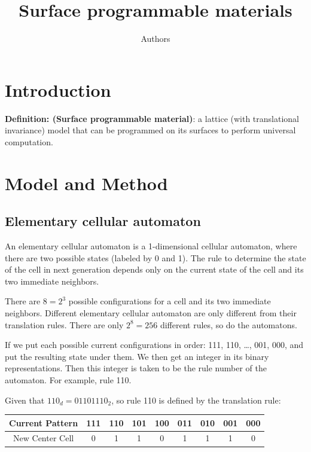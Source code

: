 \documentclass[twocolumn,superscriptaddress,english,showpacs,longbibliography]{revtex4-2}
\begin{document}
\title{Surface programmable materials}

\author{Authors}

\begin{abstract}
\end{abstract}

\maketitle

\section{Introduction}

\textbf{Definition: (Surface programmable material)}: a lattice (with
translational invariance) model that can be programmed on its surfaces
to perform universal computation.

\section{Model and Method}
\subsection{Elementary cellular automaton}\label{elementary-cellular-automaton}

An elementary cellular automaton is a 1-dimensional cellular
automaton, where there are two possible states (labeled by 0 and 1). The rule to
determine the state of the cell in next generation depends only on the
current state of the cell and its two immediate neighbors.

There are $8 = 2^3$ possible configurations for a cell and its two
immediate neighbors. Different elementary cellular automaton are only
different from their translation rules. There are only $2^8 = 256$
different rules, so do the automatons.

If we put each possible current configurations in order: 111, 110,
\ldots, 001, 000, and put the resulting state under them. We then get an
integer in its binary representations. Then this integer is taken to be
the rule number of the automaton. For example, rule 110.

Given that $110_d = 01101110_2$, so rule 110 is defined by the
translation rule:

\begin{tabular}{|c|c|c|c|c|c|c|c|c|}
\hline
Current Pattern & 111 & 110 & 101 & 100 & 011 & 010 & 001 & 000 \\
\hline
New Center Cell & 0 & 1 & 1 & 0 & 1 & 1 & 1 & 0 \\
\hline
\end{tabular}
\end{document}
